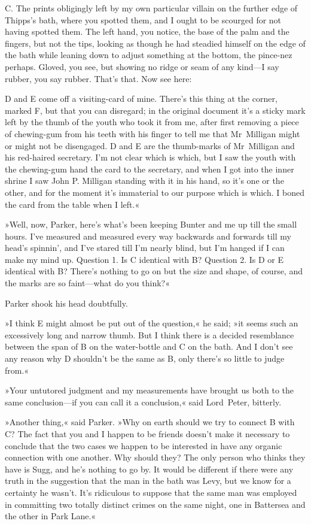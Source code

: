 \textsc{C.} The prints obligingly left by my own particular villain on the further edge of Thipps's bath, where you spotted them, and I ought to be scourged for not having spotted them. The left hand, you notice, the base of the palm and the fingers, but not the tips, looking as though he had steadied himself on the edge of the bath while leaning down to adjust something at the bottom, the pince-nez perhaps. Gloved, you see, but showing no ridge or seam of any kind—I say rubber, you say rubber. That's that. Now see here:

\textsc{D} and \textsc{E} come off a visiting-card of mine. There's this thing at the corner, marked F, but that you can disregard; in the original document it's a sticky mark left by the thumb of the youth who took it from me, after first removing a piece of chewing-gum from his teeth with his finger to tell me that Mr~Milligan might or might not be disengaged. D and E are the thumb-marks of Mr~Milligan and his red-haired secretary. I'm not clear which is which, but I saw the youth with the chewing-gum hand the card to the secretary, and when I got into the inner shrine I saw John P. Milligan standing with it in his hand, so it's one or the other, and for the moment it's immaterial to our purpose which is which. I boned the card from the table when I left.«

»Well, now, Parker, here's what's been keeping Bunter and me up till the small hours. I've measured and measured every way backwards and forwards till my head's spinnin', and I've stared till I'm nearly blind, but I'm hanged if I can make my mind up. Question 1. Is \textsc{C} identical with \textsc{B}? Question 2. Is \textsc{D} or \textsc{E} identical with \textsc{B}? There's nothing to go on but the size and shape, of course, and the marks are so faint—what do you think?«

Parker shook his head doubtfully.

»I think \textsc{E} might almost be put out of the question,« he said; »it seems such an excessively long and narrow thumb. But I think there is a decided resemblance between the span of \textsc{B} on the water-bottle and \textsc{C} on the bath. And I don't see any reason why \textsc{D} shouldn't be the same as \textsc{B}, only there's so little to judge from.«

»Your untutored judgment and my measurements have brought us both to the same conclusion—if you can call it a conclusion,« said Lord~Peter, bitterly.

»Another thing,« said Parker. »Why on earth should we try to connect \textsc{B} with \textsc{C}? The fact that you and I happen to be friends doesn't make it necessary to conclude that the two cases we happen to be interested in have any organic connection with one another. Why should they? The only person who thinks they have is Sugg, and he's nothing to go by. It would be different if there were any truth in the suggestion that the man in the bath was Levy, but we know for a certainty he wasn't. It's ridiculous to suppose that the same man was employed in committing two totally distinct crimes on the same night, one in Battersea and the other in Park Lane.«

